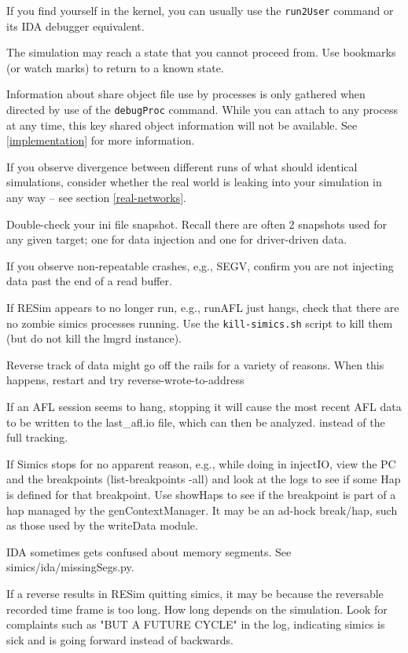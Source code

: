 \documentclass[titlepage]{article}
\begin{document}
If you find yourself in the kernel, you can usually use the {\tt run2User} command or its IDA debugger equivalent.

The simulation may reach a state that you cannot proceed from.  Use bookmarks (or watch marks) to return to a known state.

Information about share object file use by processes is only gathered when directed by use of the {\tt debugProc} command.
While you can attach to any process at any time, this key shared object information will not be available.  See \ref{implementation}
for more information.

If you observe divergence between different runs of what should identical simulations, consider whether the real world is leaking
into your simulation in any way -- see section \ref{real-networks}.

Double-check your ini file snapshot.  Recall there are often 2 snapshots used for any given target; one for data injection and one for 
driver-driven data.

If you observe non-repeatable crashes, e,g., SEGV, confirm you are not injecting data past the end of a read buffer.

If RESim appears to no longer run, e.g., runAFL just hangs, check that there are no zombie simics processes running.  Use
the {\tt kill-simics.sh} script to kill them (but do not kill the lmgrd instance).

Reverse track of data might go off the rails for a variety of reasons.  When this happens, restart and try reverse-wrote-to-address

If an AFL session seems to hang, stopping it will cause the most recent AFL data to be written to the last\_afl.io file, which can then
be analyzed.
instead of the full tracking.

If Simics stops for no apparent reason, e.g., while doing in injectIO, view the PC and the breakpoints (list-breakpoints -all)
and look at the logs to see if some Hap is defined for that breakpoint.  Use showHaps to see if the breakpoint is part of a hap
managed by the genContextManager.  It may be an ad-hock break/hap, such as those used by the writeData module.

IDA sometimes gets confused about memory segments.  See simics/ida/missingSegs.py.

If a reverse results in RESim quitting simics, it may be because the reversable recorded time frame is too long.  How long depends
on the simulation.  Look for complaints such as "BUT A FUTURE CYCLE" in the log, indicating simics is sick and is going forward
instead of backwards.
\end{document}
